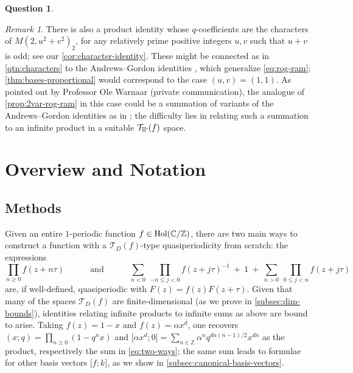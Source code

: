 \documentclass[reqno,11pt]{amsart}
\theoremstyle{definition}
\newtheorem{question}{Question}
\theoremstyle{remark}
\newtheorem*{remark}{Remark}
\numberwithin{equation}{section}
\newcommand{\Z}{\mathbb{Z}}
\newcommand{\C}{\mathbb{C}}
\newcommand{\Hminus}{{\mathbb{H}^{\textnormal{-}\hspace{-0.03cm}}}}
\newcommand{\mT}{\mathcal{T}}
\newcommand{\Hol}{\textnormal{Hol}}
\newcommand{\vect}[2]{\big[{#1};{#2}\big]}
\begin{document}
\begin{question}
\begin{remark}
There is also a product identity whose $q$-coefficients are the characters of $M(2, u^2 + v^2)_2$, for any relatively prime positive integers $u, v$ such that $u + v$ is odd; see our \cref{cor:character-identity}. These might be connected as in \cref{qtn:characters} to the Andrews--Gordon identities \cite[Theorem 7.8]{andrews1998theory}, which generalize \cref{eq:rog-ram}; \cref{thm:bases-proportional} would correspond to the case $(u, v) = (1, 1)$. As pointed out by Professor Ole Warnaar (private communication), the analogue of \cref{prop:2var-rog-ram} in this case could be a summation of variants of the Andrews--Gordon identities as in \cite[(3.21)]{berkovich2001variants}; the difficulty lies in relating such a summation to an infinite product in a suitable $\mT_\Hminus(f)$ space.
\end{remark}
\end{question}



\section{Overview and Notation}


\subsection{Methods}
Given an entire $1$-periodic function $f \in \Hol(\C/\Z)$, there are two main ways to construct a function with a $\mT_D(f)$-type quasiperiodicity from scratch: the expressions %
\begin{equation} \label{eq:two-ways}
    \prod_{n \ge 0} f(z + n\tau)
    \qquad\quad \text{and} \qquad\quad
    \sum_{n < 0}\ \prod_{-n \le j < 0} f(z + j\tau)^{-1}
    \ +\
    1
    \ +\
    \sum_{n > 0}\ \prod_{0 \le j < n} f(z + j\tau)
\end{equation}
are, if well-defined, quasiperiodic with $F(z) = f(z)F(z + \tau)$. Given that many of the spaces $\mT_D(f)$ are finite-dimensional (as we prove in \cref{subsec:dim-bounds}), identities relating infinite products to infinite sums as above are bound to arise. 
Taking $f(z) = 1 - x$ and $f(z) = \alpha x^d$, one recovers $(x; q) = \prod_{n \ge 0} (1 - q^n x)$ and $\vect{\alpha x^d}{0} = \sum_{n \in \Z} \alpha^n q^{dn(n-1)/2} x^{dn}$ as the product, respectively the sum in \cref{eq:two-ways}; the same sum leads to formulae for other basis vectors $\vect{f}{k}$, as we show in \cref{subsec:canonical-basis-vectors}. 
\end{document}
